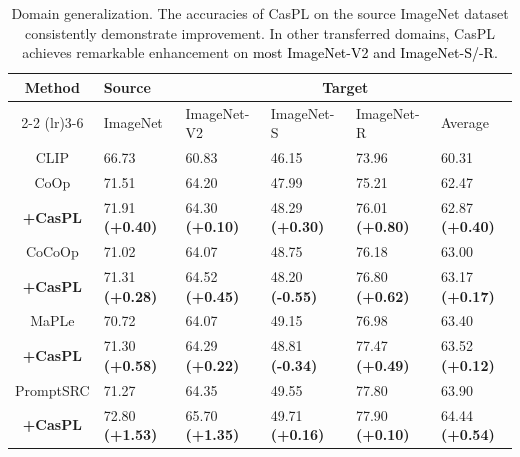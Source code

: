 \documentclass[runningheads]{llncs}
\newcommand{\rewrite}[1]{\textcolor{black}{#1}}%
\newcommand{\improve}[1]{\textcolor{boost_line}{\textbf{#1}}}
\newcommand{\decline}[1]{\textcolor{decline_color}{\textbf{#1}}}
\begin{document}
{{\begin{table}[t]
    \centering
    \caption{Domain generalization. The accuracies of CasPL on the source ImageNet dataset consistently demonstrate improvement. In other transferred domains, CasPL achieves remarkable enhancement on \rewrite{most ImageNet-V2 and ImageNet-S/-R.}}
    \resizebox{0.85\linewidth}{!}
    {
        \begin{tabular}{clllll}
        \hline
        \multirow{3}{*}{Method} & Source & \multicolumn{4}{c}{Target} \\
        \cmidrule(lr){2-2} \cmidrule(lr){3-6}
        & ImageNet & ImageNet-V2 & ImageNet-S  & ImageNet-R  & Average \\
        \hline
        CLIP & 66.73 & 60.83 & 46.15  & 73.96  &60.31  \\
        \hline
        CoOp & 71.51 & 64.20 & 47.99  & 75.21  &62.47  \\
        \rowcolor{tablecolor}\textbf{+CasPL} &71.91   \improve{(+0.40)}   &64.30   \improve{(+0.10)}   &48.29   \improve{(+0.30)}  &76.01   \improve{(+0.80)}    &62.87 \improve{(+0.40)} \\
        \hline
        CoCoOp & 71.02  & 64.07 & 48.75  & 76.18  &63.00  \\
        \rowcolor{tablecolor}\textbf{+CasPL} &71.31  \improve{(+0.28)}   &64.52  \improve{(+0.45)}  &48.20  \decline{(-0.55)}   &76.80  \improve{(+0.62)}  &63.17 \improve{(+0.17)} \\
        \hline
        MaPLe & 70.72 & 64.07 & 49.15  & 76.98  &63.40  \\
        \rowcolor{tablecolor}\textbf{+CasPL} &71.30 \improve{(+0.58)}    &64.29 \improve{(+0.22)}  & 48.81 \decline{(-0.34)}   &77.47 \improve{(+0.49)}    &63.52 \improve{(+0.12)}   \\
        \hline
        PromptSRC & 71.27 & 64.35 & 49.55  & 77.80   &63.90  \\
        \rowcolor{tablecolor}\textbf{+CasPL} &72.80 \improve{(+1.53)} &65.70 \improve{(+1.35)} & 49.71 \improve{(+0.16)} &77.90 \improve{(+0.10)}  &64.44 \improve{(+0.54)}\\
        \hline
        \end{tabular}
    }
    \label{table:domain-dataset}
\end{table}


}}
\end{document}
